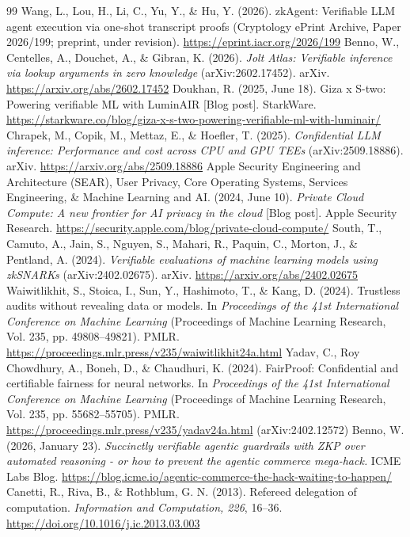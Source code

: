 \documentclass[11pt]{article}
\begin{document}
\begin{thebibliography}{99}
 Wang, L., Lou, H., Li, C., Yu, Y., \& Hu, Y. (2026). zkAgent: Verifiable LLM agent execution via one-shot transcript proofs (Cryptology ePrint Archive, Paper 2026/199; preprint, under revision). \url{https://eprint.iacr.org/2026/199}
 Benno, W., Centelles, A., Douchet, A., \& Gibran, K. (2026). \emph{Jolt Atlas: Verifiable inference via lookup arguments in zero knowledge} (arXiv:2602.17452). arXiv. \url{https://arxiv.org/abs/2602.17452}
 Doukhan, R. (2025, June 18). Giza x S-two: Powering verifiable ML with LuminAIR [Blog post]. StarkWare. \url{https://starkware.co/blog/giza-x-s-two-powering-verifiable-ml-with-luminair/}
 Chrapek, M., Copik, M., Mettaz, E., \& Hoefler, T. (2025). \emph{Confidential LLM inference: Performance and cost across CPU and GPU TEEs} (arXiv:2509.18886). arXiv. \url{https://arxiv.org/abs/2509.18886}
 Apple Security Engineering and Architecture (SEAR), User Privacy, Core Operating Systems, Services Engineering, \& Machine Learning and AI. (2024, June 10). \emph{Private Cloud Compute: A new frontier for AI privacy in the cloud} [Blog post]. Apple Security Research. \url{https://security.apple.com/blog/private-cloud-compute/}
 South, T., Camuto, A., Jain, S., Nguyen, S., Mahari, R., Paquin, C., Morton, J., \& Pentland, A. (2024). \emph{Verifiable evaluations of machine learning models using zkSNARKs} (arXiv:2402.02675). arXiv. \url{https://arxiv.org/abs/2402.02675}
 Waiwitlikhit, S., Stoica, I., Sun, Y., Hashimoto, T., \& Kang, D. (2024). Trustless audits without revealing data or models. In \emph{Proceedings of the 41st International Conference on Machine Learning} (Proceedings of Machine Learning Research, Vol. 235, pp. 49808--49821). PMLR. \url{https://proceedings.mlr.press/v235/waiwitlikhit24a.html}
 Yadav, C., Roy Chowdhury, A., Boneh, D., \& Chaudhuri, K. (2024). FairProof: Confidential and certifiable fairness for neural networks. In \emph{Proceedings of the 41st International Conference on Machine Learning} (Proceedings of Machine Learning Research, Vol. 235, pp. 55682--55705). PMLR. \url{https://proceedings.mlr.press/v235/yadav24a.html} (arXiv:2402.12572)
 Benno, W. (2026, January 23). \emph{Succinctly verifiable agentic guardrails with ZKP over automated reasoning - or how to prevent the agentic commerce mega-hack.} ICME Labs Blog. \url{https://blog.icme.io/agentic-commerce-the-hack-waiting-to-happen/}
 Canetti, R., Riva, B., \& Rothblum, G. N. (2013). Refereed delegation of computation. \emph{Information and Computation, 226}, 16--36. \url{https://doi.org/10.1016/j.ic.2013.03.003}

\end{thebibliography}
\end{document}
